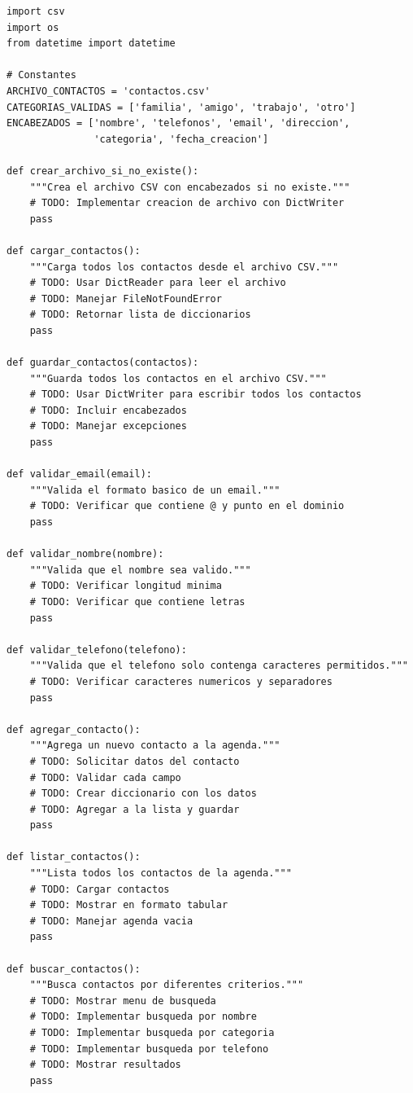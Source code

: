 \documentclass[11pt,letterpaper]{article}
\begin{document}
\begin{lstlisting}[caption={Plantilla básica del sistema}]
import csv
import os
from datetime import datetime

# Constantes
ARCHIVO_CONTACTOS = 'contactos.csv'
CATEGORIAS_VALIDAS = ['familia', 'amigo', 'trabajo', 'otro']
ENCABEZADOS = ['nombre', 'telefonos', 'email', 'direccion', 
               'categoria', 'fecha_creacion']

def crear_archivo_si_no_existe():
    """Crea el archivo CSV con encabezados si no existe."""
    # TODO: Implementar creacion de archivo con DictWriter
    pass

def cargar_contactos():
    """Carga todos los contactos desde el archivo CSV."""
    # TODO: Usar DictReader para leer el archivo
    # TODO: Manejar FileNotFoundError
    # TODO: Retornar lista de diccionarios
    pass

def guardar_contactos(contactos):
    """Guarda todos los contactos en el archivo CSV."""
    # TODO: Usar DictWriter para escribir todos los contactos
    # TODO: Incluir encabezados
    # TODO: Manejar excepciones
    pass

def validar_email(email):
    """Valida el formato basico de un email."""
    # TODO: Verificar que contiene @ y punto en el dominio
    pass

def validar_nombre(nombre):
    """Valida que el nombre sea valido."""
    # TODO: Verificar longitud minima
    # TODO: Verificar que contiene letras
    pass

def validar_telefono(telefono):
    """Valida que el telefono solo contenga caracteres permitidos."""
    # TODO: Verificar caracteres numericos y separadores
    pass

def agregar_contacto():
    """Agrega un nuevo contacto a la agenda."""
    # TODO: Solicitar datos del contacto
    # TODO: Validar cada campo
    # TODO: Crear diccionario con los datos
    # TODO: Agregar a la lista y guardar
    pass

def listar_contactos():
    """Lista todos los contactos de la agenda."""
    # TODO: Cargar contactos
    # TODO: Mostrar en formato tabular
    # TODO: Manejar agenda vacia
    pass

def buscar_contactos():
    """Busca contactos por diferentes criterios."""
    # TODO: Mostrar menu de busqueda
    # TODO: Implementar busqueda por nombre
    # TODO: Implementar busqueda por categoria
    # TODO: Implementar busqueda por telefono
    # TODO: Mostrar resultados
    pass


\end{lstlisting}
\end{document}
